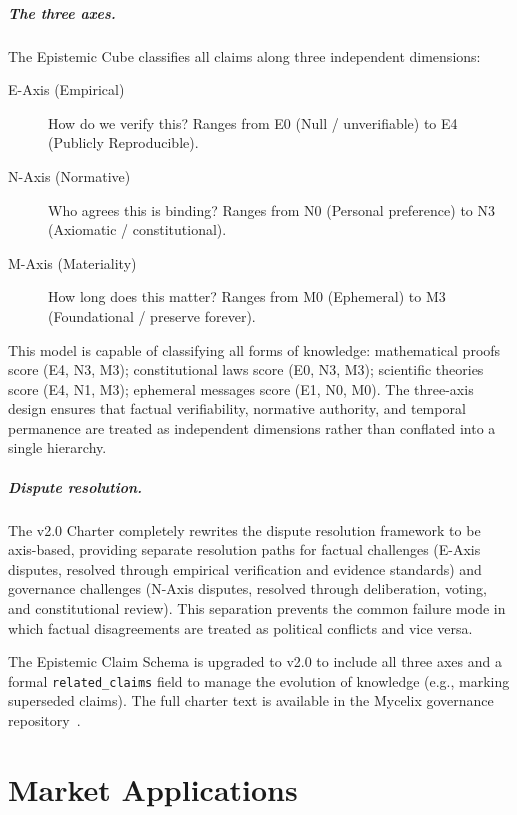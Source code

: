 \documentclass[12pt]{book}
\begin{document}
\paragraph{The three axes.}
The Epistemic Cube classifies all claims along three independent dimensions:
\begin{description}
  \item[E-Axis (Empirical)] How do we verify this? Ranges from E0 (Null /
    unverifiable) to E4 (Publicly Reproducible).
  \item[N-Axis (Normative)] Who agrees this is binding? Ranges from N0
    (Personal preference) to N3 (Axiomatic / constitutional).
  \item[M-Axis (Materiality)] How long does this matter? Ranges from M0
    (Ephemeral) to M3 (Foundational / preserve forever).
\end{description}

This model is capable of classifying all forms of knowledge: mathematical proofs
score (E4, N3, M3); constitutional laws score (E0, N3, M3); scientific theories
score (E4, N1, M3); ephemeral messages score (E1, N0, M0). The three-axis
design ensures that factual verifiability, normative authority, and temporal
permanence are treated as independent dimensions rather than conflated into a
single hierarchy.

\paragraph{Dispute resolution.}
The v2.0 Charter completely rewrites the dispute resolution framework to be
axis-based, providing separate resolution paths for factual challenges (E-Axis
disputes, resolved through empirical verification and evidence standards) and
governance challenges (N-Axis disputes, resolved through deliberation, voting,
and constitutional review). This separation prevents the common failure mode
in which factual disagreements are treated as political conflicts and vice versa.

The Epistemic Claim Schema is upgraded to v2.0 to include all three axes and a
formal \texttt{related\_claims} field to manage the evolution of knowledge
(e.g., marking superseded claims). The full charter text is available in the
Mycelix governance repository~\cite{epistemiccharter}.


\chapter{Market Applications}
\label{app:markets}
\end{document}

